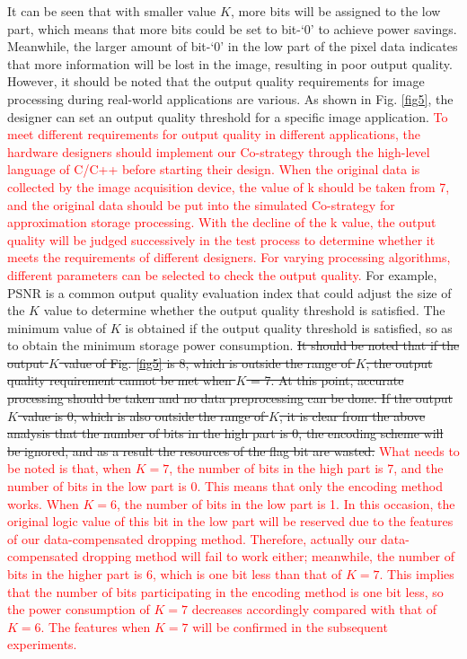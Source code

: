 \documentclass[lettersize,journal]{IEEEtran}
\begin{document}
It can be seen that with smaller value $K$, more bits will be assigned to the low part, which means that more bits could be set to bit-`0' to achieve power savings. Meanwhile, the larger amount of bit-`0' in the low part of the pixel data indicates that more information will be lost in the image, resulting in poor output quality. However, it should be noted that the output quality requirements for image processing during real-world applications are various. As shown in Fig. \ref{fig5}, the designer can set an output quality threshold for a specific image application. 
\textcolor{red}{To meet different requirements for output quality in different applications, the hardware designers should implement our Co-strategy through the high-level language of C/C++ before starting their design. When the original data is collected by the image acquisition device, the value of k should be taken from 7, and the original data should be put into the simulated Co-strategy for approximation storage processing. With the decline of the k value, the output quality will be judged successively in the test process to determine whether it meets the requirements of different designers. For varying processing algorithms, different parameters can be selected to check the output quality. }
For example, PSNR is a common output quality evaluation index that could adjust the size of the $K$ value to determine whether the output quality threshold is satisfied. The minimum value of $K$ is obtained if the output quality threshold is satisfied, so as to obtain the minimum storage power consumption. {\color{red}\sout{It should be noted that if the output $K$ value of Fig. \ref{fig5} is 8, which is outside the range of $K$, the output quality requirement cannot be met when $K$ = 7. At this point, accurate processing should be taken and no data preprocessing can be done. If the output $K$ value is 0, which is also outside the range of $K$, it is clear from the above analysis that the number of bits in the high part is 0, the encoding scheme will be ignored, and as a result the resources of the flag bit are wasted.}}
\textcolor{red}{What needs to be noted is that, when $K=7$, the number of bits in the high part is 7, and the number of bits in the low part is 0. This means that only the encoding method works. When $K=6$, the number of bits in the low part is 1. In this occasion, the original logic value of this bit in the low part will be reserved due to the features of our data-compensated dropping method. Therefore, actually our data-compensated dropping method will fail to work either; meanwhile, the number of bits in the higher part is 6, which is one bit less than that of $K=7$. This implies that the number of bits participating in the encoding method is one bit less, so the power consumption of $K=7$ decreases accordingly compared with that of $K=6$. The features when $K=7$ will be confirmed in the subsequent experiments.}
\end{document}
